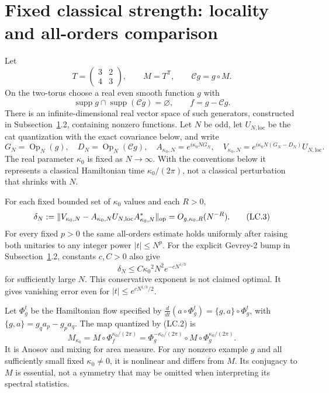 \section{Fixed classical strength: locality and all-orders comparison}\label{sec:locality}
Let \[
 T=\begin{pmatrix}3&2\\4&3\end{pmatrix},\qquad M=T^{\mathsf T},\qquad
 \mathcal Cg=g\circ M.
\] On the two-torus choose a real even smooth function \(g\) with \[
 \operatorname{supp}g\cap\operatorname{supp}(\mathcal Cg)=\varnothing,
 \qquad f=g-\mathcal Cg.                                      \tag{LC.1}
\] There is an infinite-dimensional real vector space of such generators, constructed in Subsection~\ref{sec:locality}.2, containing nonzero functions. Let \(N\) be odd, let \(U_{N,\mathrm{loc}}\) be the cat quantization with the exact covariance below, and write \[
 G_N=\operatorname{Op}_N(g),\quad D_N=\operatorname{Op}_N(\mathcal Cg),
 \quad A_{{\kappa_0},N}=e^{i{\kappa_0} NG_N},\quad
 V_{{\kappa_0},N}=e^{i{\kappa_0} N(G_N-D_N)}U_{N,\mathrm{loc}}.                       \tag{LC.2}
\] The real parameter \({\kappa_0}\) is fixed as \(N\to\infty\). With the conventions below it represents a classical Hamiltonian time \({\kappa_0}/(2\pi)\), not a classical perturbation that shrinks with \(N\).

\begin{theorem}\label{pass1:ch09_locality_fixed_strength-1} For each fixed bounded set of \({\kappa_0}\) values and each \(R>0\), \[
 \delta_N:=\|V_{{\kappa_0},N}-A_{{\kappa_0},N}U_{N,\mathrm{loc}}A_{{\kappa_0},N}^*\|_{\rm op}
       =O_{g,{\kappa_0},R}(N^{-R}).                              \tag{LC.3}
\] For every fixed \(p>0\) the same all-orders estimate holds uniformly after raising both unitaries to any integer power \(|t|\leq N^p\). For the explicit Gevrey-2 bump in Subsection~\ref{sec:locality}.2, constants \(c,C>0\) also give \[
 \delta_N\leq C{\kappa_0}^2N^2e^{-cN^{1/3}}                      \tag{LC.4}
\] for sufficiently large \(N\). This conservative exponent is not claimed optimal. It gives vanishing error even for \(|t|\leq e^{cN^{1/3}/2}\).
\end{theorem}

\begin{theorem}\label{pass1:ch09_locality_fixed_strength-2} Let \(\Phi_g^t\) be the Hamiltonian flow specified by \(\frac{d}{dt}(a\circ\Phi_g^t)=\{g,a\}\circ\Phi_g^t\), with \(\{g,a\}=g_q a_p-g_p a_q\). The map quantized by (LC.2) is \[
 M_{\kappa_0}=M\circ\Phi_f^{{\kappa_0}/(2\pi)}
 =\Phi_g^{-{\kappa_0}/(2\pi)}\circ M\circ\Phi_g^{{\kappa_0}/(2\pi)}. \tag{LC.5}
\] It is Anosov and mixing for area measure. For any nonzero example \(g\) and all sufficiently small fixed \({\kappa_0}\ne0\), it is nonlinear and differs from \(M\). Its conjugacy to \(M\) is essential, not a symmetry that may be omitted when interpreting its spectral statistics.
\end{theorem}

